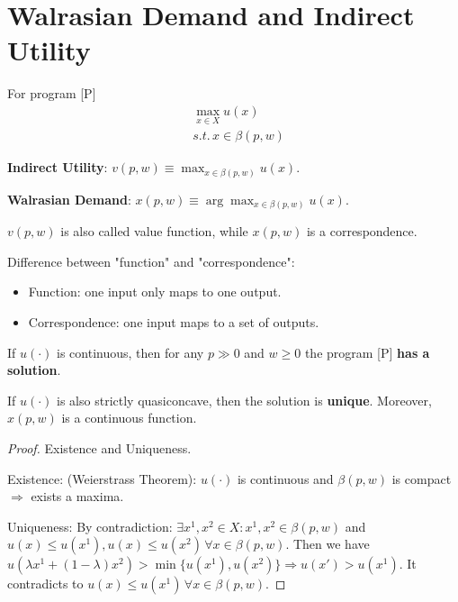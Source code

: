 \section{Walrasian Demand and Indirect Utility}

\begin{definition}
    For program [P] \begin{align*}
         & \max_{x \in X} u(x)      \\
         & s.t. \, x \in \beta(p,w)
    \end{align*}

    \textbf{Indirect Utility}: $v(p,w) \equiv \max_{x \in \beta(p,w)} u(x)$.

    \textbf{Walrasian Demand}: $x(p,w) \equiv \arg\max_{x \in \beta(p,w)} u(x)$.

\end{definition}

\begin{remark*}
    $v(p,w)$ is also called value function, while $x(p,w)$ is a correspondence.

    Difference between "function" and "correspondence": \begin{itemize}
        \item Function: one input only maps to one output.
        \item Correspondence: one input maps to a set of outputs.
    \end{itemize}
\end{remark*}

\begin{proposition}
    If $u(\cdot )$ is continuous, then for any $p \gg 0$ and $w \geq 0$ the program [P] \textbf{has a solution}.

    If $u(\cdot )$ is also strictly quasiconcave, then the solution is \textbf{unique}. Moreover, $x(p,w)$ is a continuous function.
\end{proposition}

\begin{proof} Existence and Uniqueness.

    Existence: (Weierstrass Theorem): $u(\cdot )$ is continuous and $\beta(p,w)$ is compact $\Longrightarrow$ exists a maxima.

    Uniqueness: By contradiction: $\exists x^1, x^2 \in X: x^1, x^2 \in \beta(p,w) $ and $u(x) \leq u(x^1), u(x)\leq u(x^2)\, \forall x \in \beta(p,w)$. Then we have $u(\lambda x^1 + (1-\lambda)x^2) > \min\{u(x^1), u(x^2)\} \Longrightarrow u(x') > u(x^1)$. It contradicts to $u(x) \leq u(x^1)\, \forall x \in \beta(p,w)$.
\end{proof}